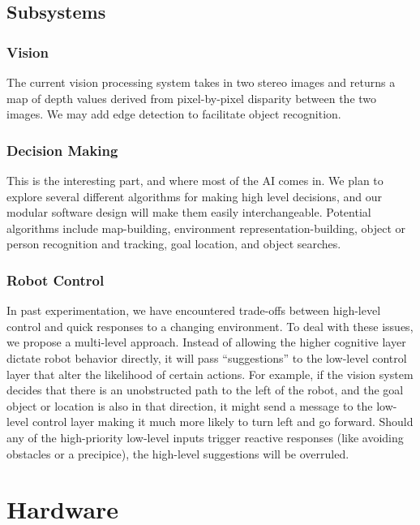 \documentclass[12pt]{article}
\begin{document}
\subsection{Subsystems}


\subsubsection{Vision}

The current vision processing system takes in two stereo images and returns
a map of depth values derived from pixel-by-pixel disparity between
the two images. We may add edge detection to facilitate object recognition.


\subsubsection{Decision Making}

This is the interesting part, and where most of the AI comes in. We plan to explore several different algorithms for making high level decisions, and our modular software design will make
them easily interchangeable. Potential algorithms include map-building,  environment
representation-building, object or person recognition and tracking, goal location, and object searches.


\subsubsection{Robot Control}

In past experimentation, we have encountered trade-offs between high-level control and quick responses to a changing environment.  To deal with these issues, we propose a multi-level approach.  Instead of allowing the higher cognitive layer dictate robot behavior directly, it will pass ``suggestions'' to the low-level control layer that alter the likelihood of certain actions. For example, if the vision system decides
that there is an unobstructed path to the left of the robot, and the goal object
or location is also in that direction, it might send a message to the low-level control layer making
it much more likely to turn left and go forward. Should any
of the high-priority low-level inputs trigger reactive responses (like avoiding
obstacles or a precipice), the high-level suggestions will be overruled.


\section{Hardware}
\end{document}
